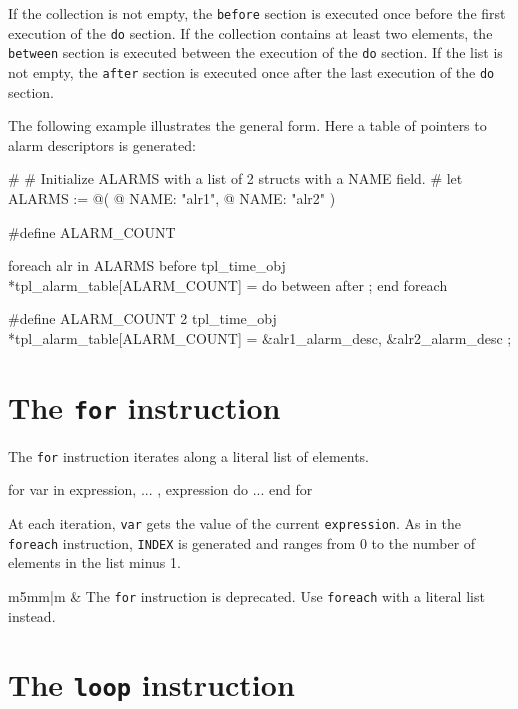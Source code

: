\documentclass[10pt,openright,twosides,final]{memoir}
\newcommand{\icst}[1]{{\footnotesize\ttfamily\colorbox{light-blue}{#1}}}
\newcommand{\gtlinline}[1]{\colorbox{light-blue}{\lstinline[language=gtl]{#1}}}
\newcommand\Warning{%
 \makebox[1.4em][c]{%
 \makebox[0pt][c]{\raisebox{-.05em}{\scriptsize!}}%
 \makebox[0pt][c]{\raisebox{-.2em}{\color{red}\Large$\bigtriangleup$}}}}%
\newcommand{\warning}[1]{%
\vspace{1em}
\hspace{-18.3mm}
\rowcolors{1}{white}{light-gray}
\begin{tabular}[b]{m{5mm}|m{\linewidth}}
\Warning & #1\\
\end{tabular}
}
\begin{document}
If the collection is not empty, the \gtlinline{before} section is executed once before the first execution of the \gtlinline{do} section. If the collection contains at least two elements, the \gtlinline{between} section is executed between the execution of the \gtlinline{do} section.  If the list is not empty, the \gtlinline{after} section is executed once after the last execution of the \gtlinline{do} section.

The following example illustrates the general form. Here a table of pointers to alarm descriptors is generated:

\begin{gtl}
#
# Initialize ALARMS with a list of 2 structs with a NAME field.
#
let ALARMS := @( @{ NAME: "alr1"}, @{ NAME: "alr2"} )

%
#define ALARM_COUNT %

foreach alr in ALARMS
  before %
tpl_time_obj *tpl_alarm_table[ALARM_COUNT] = {
%
  do %
  between %
%
  after %
};
%
end foreach
\end{gtl}
\begin{templateoutput}
#define ALARM_COUNT 2
tpl_time_obj *tpl_alarm_table[ALARM_COUNT] = {
  &alr1_alarm_desc,
  &alr2_alarm_desc
};
\end{templateoutput}

%
%
\section{The \texttt{for} instruction}

The \gtlinline{for} instruction iterates along a literal list of elements.

\begin{gtl}
for var in expression, ... , expression do
  ...
end for
\end{gtl}

At each iteration, \gtlinline{var} gets the value of the current \gtlinline{expression}. As in the \gtlinline{foreach} instruction, \gtlinline{INDEX} is generated and ranges from \icst{0} to the number of elements in the list minus 1.

\warning{The \gtlinline{for} instruction is deprecated. Use \gtlinline{foreach} with a literal list instead.}

\section{The \texttt{loop} instruction}
\end{document}
